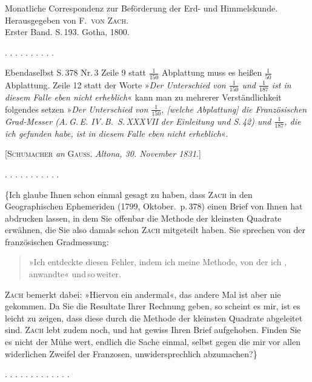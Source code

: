 \clearpage
{}
\begin{center}
Monatliche Correspondenz zur Beförderung der Erd- und Himmelskunde. Herausgegeben von F.\ \textsc{von Zach}.\\
Erster Band. S.\,193. Gotha, 1800.
\end{center}

\begin{center}
\end{center}

\begin{center}
. . . . . . . . . .
\end{center}

Ebendaselbst S.\,378 Nr.\,3 Zeile 9 statt $\frac{1}{150}$ Abplattung muss es heißen $\frac{1}{50}$ Abplattung. Zeile 12 statt der Worte »\emph{Der Unterschied von $\frac{1}{150}$ und $\frac{1}{187}$ ist in diesem Falle eben nicht erheblich}« kann man zu mehrerer Verständlichkeit folgendes setzen »\emph{Der Unterschied von $\frac{1}{150}$, [welche Abplattung] die Französischen Grad-Messer (A.\,G.\,E. IV.\,B.\ S.\,XXXVII der Einleitung und S.\,42) und $\frac{1}{187}$, die ich gefunden habe, ist in diesem Falle eben nicht erheblich}«.

\bigskip
\begin{center}
[\textsc{Schumacher} \emph{an} \textsc{Gauss}. \emph{Altona, 30. November 1831.}]
\end{center}

\begin{center}
. . . . . . . . . . .
\end{center}

\{Ich glaube Ihnen schon einmal gesagt zu haben, dass \textsc{Zach} in den Geographischen Ephemeriden (1799, Oktober.\ p.\,378) einen Brief von Ihnen hat abdrucken lassen, in dem Sie offenbar die Methode der kleinsten Quadrate erwähnen, die Sie also damals schon \textsc{Zach} mitgeteilt haben. Sie sprechen von der französischen Gradmessung:

\begin{quote}
»Ich entdeckte diesen Fehler, indem ich meine Methode, von der ich , anwandte« und\,so\,weiter.
\end{quote}

\textsc{Zach} bemerkt dabei: »Hiervon ein andermal«, das andere Mal ist aber nie gekommen. Da Sie die Resultate Ihrer Rechnung geben, so scheint es mir, ist es leicht zu zeigen, dass diese durch die Methode der kleinsten Quadrate abgeleitet sind. \textsc{Zach} lebt zudem noch, und hat gewiss Ihren Brief aufgehoben. Finden Sie es nicht der Mühe wert, endlich die Sache einmal, selbst gegen die mir vor allen widerlichen  Zweifel der Franzosen, unwidersprechlich abzumachen?\}

\begin{center}
. . . . . . . . . . . . .
\end{center}
